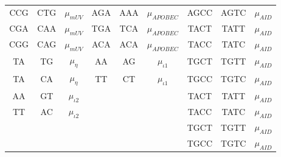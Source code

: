 \documentclass{article}
\newcommand{\nA}{\mbox{A}}  %
\newcommand{\nC}{\mbox{C}}
\newcommand{\nG}{\mbox{G}}
\newcommand{\nT}{\mbox{T}}
\theoremstyle{plain}
\theoremstyle{definition}
\begin{document}
\begin{itemize}
\begin{center}
\begin{tabular}{c@{\quad$\to$\quad}c@{\quad at rate\quad }c|c@{\quad$\to$\quad}c@{\quad at rate\quad }c|c@{\quad$\to$\quad}c@{\quad at rate\quad }c}
                \nC\nC\nG  &   \nC\nT\nG   &  $\mu_{mUV}$    & \nA\nG\nA  &   \nA\nA\nA   &  $\mu_{APOBEC}$ & \nA\nG\nC\nC  &   \nA\nG\nT\nC   &  $\mu_{AID}$ \\
                \nC\nG\nA  &   \nC\nA\nA   &  $\mu_{mUV}$    & \nT\nG\nA  &   \nT\nC\nA   &  $\mu_{APOBEC}$ & \nT\nA\nC\nT  &   \nT\nA\nT\nT   &  $\mu_{AID}$ \\
                \nC\nG\nG  &   \nC\nA\nG   &  $\mu_{mUV}$    & \nA\nC\nA  &   \nA\nC\nA   &  $\mu_{APOBEC}$ & \nT\nA\nC\nC  &   \nT\nA\nT\nC   &  $\mu_{AID}$ \\
                \nT\nA     &   \nT\nG      &  $\mu_{\eta}$   & \nA\nA    &    \nA\nG      &  $\mu_{\iota1}$ & \nT\nG\nC\nT  &   \nT\nG\nT\nT   &  $\mu_{AID}$ \\
                \nT\nA     &   \nC\nA      &  $\mu_{\eta}$   & \nT\nT    &    \nC\nT      &  $\mu_{\iota1}$ & \nT\nG\nC\nC  &   \nT\nG\nT\nC   &  $\mu_{AID}$ \\
                \nA\nA     &   \nG\nT      &  $\mu_{\iota2}$ &           &                &                 & \nT\nA\nC\nT  &   \nT\nA\nT\nT   &  $\mu_{AID}$ \\
                \nT\nT     &   \nA\nC      &  $\mu_{\iota2}$ &           &                &                 & \nT\nA\nC\nC  &   \nT\nA\nT\nC   &  $\mu_{AID}$ \\
                           &               &                 &           &                &                 & \nT\nG\nC\nT  &   \nT\nG\nT\nT   &  $\mu_{AID}$ \\
                           &               &                 &           &                &                 & \nT\nG\nC\nC  &   \nT\nG\nT\nC   &  $\mu_{AID}$ \\
            \end{tabular}
          \end{center}


\end{itemize}
\end{document}
